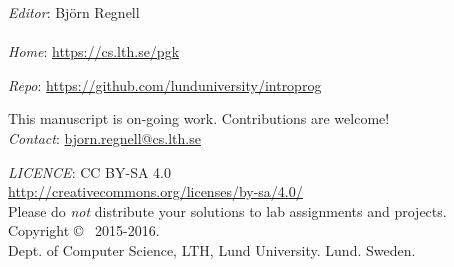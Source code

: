 
\clearpage\null\thispagestyle{empty}
\vfill

{
\setlength{\parindent}{0pt}
\emph{Editor}: Björn Regnell \\ 


\\

\emph{Home}: \url{https://cs.lth.se/pgk} \\ \newline

\emph{Repo}: \url{https://github.com/lunduniversity/introprog} \\ \newline


This manuscript is on-going work. Contributions are welcome! \\ 
\emph{Contact}: \url{bjorn.regnell@cs.lth.se}
\\ \newline

\emph{LICENCE}: CC BY-SA 4.0 \\
\url{http://creativecommons.org/licenses/by-sa/4.0/} \\
Please do \emph{not} distribute your solutions to lab assignments and projects. 
\\ \newline
Copyright \copyright~ 2015-2016. \\
Dept. of Computer Science, LTH, Lund University. Lund. Sweden.\\
}